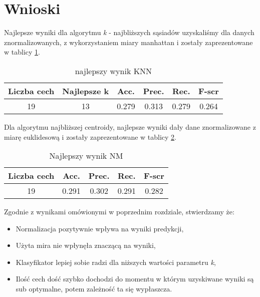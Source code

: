 \section{Wnioski}

	Najlepsze wyniki dla algorytmu \textit{k} - najbliższych sąsiadów uzyskaliśmy dla danych znormalizowanych, z wykorzystaniem miary manhattan i zostały zaprezentowane w tablicy \ref{7}.
	
	\begin{table}[h!]
		\centering
		\begin{tabular}{|| c | c  | c | c | c | c ||} 
			\hline
			Liczba cech & Najlepsze k & Acc. &  Prec. & Rec. & F-scr \\ [0.5ex] 
			\hline\hline
			19 & 13 &  0.279 & 0.313 & 0.279 & 0.264 \\[1ex] 
			\hline
		\end{tabular}
		\caption{najlepszy wynik KNN}
		\label{7}
	\end{table}
	
	Dla algorytmu najbliższej centroidy, najlepsze wyniki dały dane znormalizowane z miarę euklidesową i zostały zaprezentowane w tablicy \ref{8}.
	
	\begin{table}[h!]
		\centering
		\begin{tabular}{|| c | c  | c | c | c ||} 
			\hline
			Liczba cech & Acc. &  Prec. & Rec. & F-scr \\ [0.5ex] 
			\hline\hline
			19 & 0.291 & 0.302 & 0.291 & 0.282 \\ [1ex] 
			\hline
		\end{tabular}
		\caption{Najlepszy wynik NM}
		\label{8}
	\end{table}

	Zgodnie z wynikami omówionymi w poprzednim rozdziale, stwierdzamy że:
	\begin{itemize}
		\item Normalizacja pozytywnie wpływa na wyniki predykcji,
		\item Użyta mira nie wpłynęła  znaczącą na wyniki,
		\item Klasyfikator lepiej sobie radzi dla niższych wartości parametru \textit{k},
		\item Ilość cech dość szybko dochodzi do momentu w którym uzyskiwane wyniki są sub optymalne, potem zależność ta się wypłaszcza.
	\end{itemize}